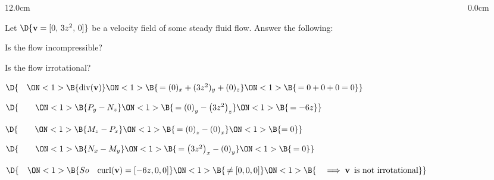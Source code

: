 \begin{frame}
\frametitle{}
\scriptsize
\begin{columns}\begin{column}{12.0cm}

\EX Let $\D{{\bf v} = [0,\, 3z^2,\, 0]}$ be a velocity field of some steady fluid flow.  Answer the following:

\vspace{0.1cm} 

\OBUL Is the flow incompressible?  \quad
{}

\vspace{0.1cm}

\OBUL Is the flow irrotational?  \quad
{}

\vspace{0.1cm}


%

\vspace{0.6cm}

$\D{\quad
\ON<1>{\B{\text{div}({\bf v})}}
\ON<1>{\B{\, = (0)_x + (3z^2)_y + (0)_z}}
\ON<1>{\B{\, = 0 + 0 + 0 = 0}}}$ \quad 
{}

\vspace{0.8cm}

$\D{\qquad
\ON<1>{\B{P_y-N_z }}
\ON<1>{\B{\, = \left(0\right)_y - \left(3z^2\right)_z }}
\ON<1>{\B{\, = -6z}}}$

\vspace{0.3cm}

$\D{\qquad
\ON<1>{\B{M_z-P_x }}
\ON<1>{\B{\,= \left(0\right)_z - \left(0\right)_x }}
\ON<1>{\B{= 0}}}$

\vspace{0.3cm}

$\D{\qquad
\ON<1>{\B{N_x-M_y }}
\ON<1>{\B{\,= \left(3z^2\right)_x - \left(0\right)_y }}
\ON<1>{\B{\,= 0}}}$

\vspace{0.3cm}

$\D{\quad 
\ON<1>{\B{So \quad \text{curl}({\bf v}) = [-6z,0,0] }}
\ON<1>{\B{\, \ne [0,0,0]}}
\ON<1>{\B{\quad \implies {\bf v} \text{\, is not irrotational}}}}$

\vspace{3.2cm}

\end{column}\begin{column}{0.0cm}\end{column}\end{columns}
\end{frame}

